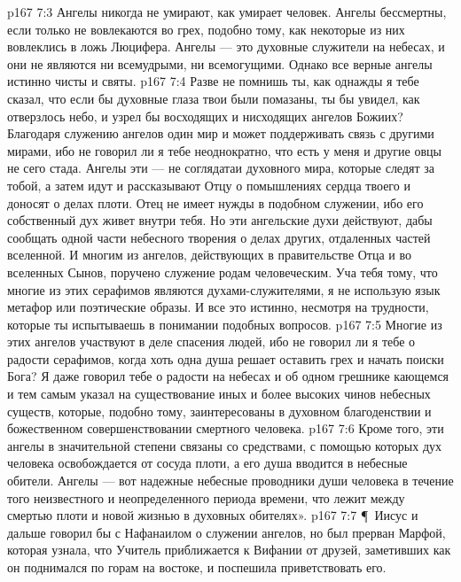 \vs p167 7:3 Ангелы никогда не умирают, как умирает человек. Ангелы бессмертны, если только не вовлекаются во грех, подобно тому, как некоторые из них вовлеклись в ложь Люцифера. Ангелы --- это духовные служители на небесах, и они не являются ни всемудрыми, ни всемогущими. Однако все верные ангелы истинно чисты и святы.
\vs p167 7:4 Разве не помнишь ты, как однажды я тебе сказал, что если бы духовные глаза твои были помазаны, ты бы увидел, как отверзлось небо, и узрел бы восходящих и нисходящих ангелов Божиих? Благодаря служению ангелов один мир и может поддерживать связь с другими мирами, ибо не говорил ли я тебе неоднократно, что есть у меня и другие овцы не сего стада. Ангелы эти --- не соглядатаи духовного мира, которые следят за тобой, а затем идут и рассказывают Отцу о помышлениях сердца твоего и доносят о делах плоти. Отец не имеет нужды в подобном служении, ибо его собственный дух живет внутри тебя. Но эти ангельские духи действуют, дабы сообщать одной части небесного творения о делах других, отдаленных частей вселенной. И многим из ангелов, действующих в правительстве Отца и во вселенных Сынов, поручено служение родам человеческим. Уча тебя тому, что многие из этих серафимов являются духами\hyp{}служителями, я не использую язык метафор или поэтические образы. И все это истинно, несмотря на трудности, которые ты испытываешь в понимании подобных вопросов.
\vs p167 7:5 Многие из этих ангелов участвуют в деле спасения людей, ибо не говорил ли я тебе о радости серафимов, когда хоть одна душа решает оставить грех и начать поиски Бога? Я даже говорил тебе о радости  на небесах и об одном грешнике кающемся и тем самым указал на существование иных и более высоких чинов небесных существ, которые, подобно тому, заинтересованы в духовном благоденствии и божественном совершенствовании смертного человека.
\vs p167 7:6 Кроме того, эти ангелы в значительной степени связаны со средствами, с помощью которых дух человека освобождается от сосуда плоти, а его душа вводится в небесные обители. Ангелы --- вот надежные небесные проводники души человека в течение того неизвестного и неопределенного периода времени, что лежит между смертью плоти и новой жизнью в духовных обителях».
\vs p167 7:7 \P\ Иисус и дальше говорил бы с Нафанаилом о служении ангелов, но был прерван Марфой, которая узнала, что Учитель приближается к Вифании от друзей, заметивших как он поднимался по горам на востоке, и поспешила приветствовать его.
